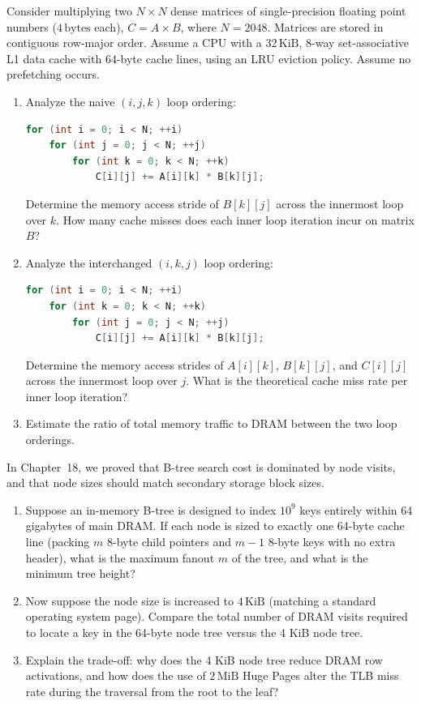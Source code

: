 \begin{exercise}
\label{ch40:ex-matrix-loops}
Consider multiplying two $N \times N$ dense matrices of single-precision floating point numbers ($4\,\text{bytes}$ each), $C = A \times B$, where $N = 2048$. Matrices are stored in contiguous row-major order.
Assume a CPU with a $32\,\text{KiB}$, 8-way set-associative L1 data cache with 64-byte cache lines, using an LRU eviction policy. Assume no prefetching occurs.
\begin{enumerate}[itemsep=0pt]
    \item Analyze the naive $(i, j, k)$ loop ordering:
\begin{lstlisting}[language=C++]
for (int i = 0; i < N; ++i)
    for (int j = 0; j < N; ++j)
        for (int k = 0; k < N; ++k)
            C[i][j] += A[i][k] * B[k][j];
\end{lstlisting}
    Determine the memory access stride of $B[k][j]$ across the innermost loop over $k$.
    How many cache misses does each inner loop iteration incur on matrix $B$?
    \item Analyze the interchanged $(i, k, j)$ loop ordering:
\begin{lstlisting}[language=C++]
for (int i = 0; i < N; ++i)
    for (int k = 0; k < N; ++k)
        for (int j = 0; j < N; ++j)
            C[i][j] += A[i][k] * B[k][j];
\end{lstlisting}
    Determine the memory access strides of $A[i][k]$, $B[k][j]$, and $C[i][j]$ across
    the innermost loop over $j$. What is the theoretical cache miss rate per inner loop
    iteration?
    \item Estimate the ratio of total memory traffic to DRAM between the two loop orderings.
\end{enumerate}
\end{exercise}

\begin{exercise}
\label{ch40:ex-btree-sizing}
In Chapter~18, we proved that B-tree search cost is dominated by node visits, and that node sizes should match secondary storage block sizes.
\begin{enumerate}[itemsep=0pt]
    \item Suppose an in-memory B-tree is designed to index $10^9$ keys entirely within 64 gigabytes of main DRAM. If each node is sized to exactly one 64-byte cache line (packing $m$ 8-byte child pointers and $m-1$ 8-byte keys with no extra header), what is the maximum fanout $m$ of the tree, and what is the minimum tree height?
    \item Now suppose the node size is increased to $4\,\text{KiB}$ (matching a standard operating system page). Compare the total number of DRAM visits required to locate a key in the 64-byte node tree versus the 4 KiB node tree.
    \item Explain the trade-off: why does the 4 KiB node tree reduce DRAM row activations, and how does the use of $2\,\text{MiB}$ Huge Pages alter the TLB miss rate during the traversal from the root to the leaf?
\end{enumerate}
\end{exercise}

